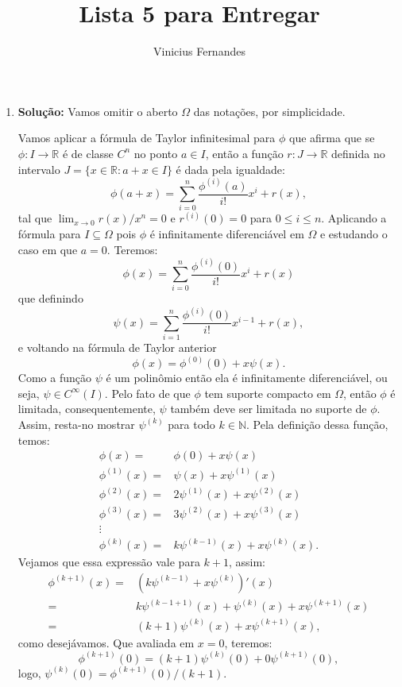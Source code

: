 \documentclass{article}
\begin{document}
	
	\title{Lista 5 para Entregar}
	\author{Vinicius Fernandes}
	
	\maketitle
	
	\begin{enumerate}
		
		\item \textbf{Solução:} Vamos omitir o aberto $\Omega$ das notações, por simplicidade.
		
		Vamos aplicar a fórmula de Taylor infinitesimal para $\phi$ que afirma que se $\phi : I \to \mathbb{R}$ é de classe $C^{n}$ no ponto $a \in I$, então a função $r:J \to \mathbb{R}$ definida no intervalo $J=\{x \in \mathbb{R}: a+x \in I\}$ é dada pela igualdade:
		$$
		\phi(a+x) = \sum_{i=0}^{n}\frac{\phi^{(i)}(a)}{i!}x^{i} + r(x),
		$$
		tal que $\lim_{x \to 0} r(x)/x^{n} = 0$ e $r^{(i)}(0) = 0$ para $0 \leq i \leq n$.
		Aplicando a fórmula para $I \subseteq \Omega$ pois $\phi$ é infinitamente diferenciável em $\Omega$ e estudando o caso em que $a=0$. Teremos: 
		$$
		\phi(x) = \sum_{i=0}^{n}\frac{\phi^{(i)}(0)}{i!}x^{i} + r(x)
		$$
		que definindo
		$$
		\psi(x) = \sum_{i=1}^{n}\frac{\phi^{(i)}(0)}{i!}x^{i-1} + r(x),
		$$
		e voltando na fórmula de Taylor anterior	
		$$
		\phi(x) = \phi^{(0)}(0) + x \psi(x).
		$$
		Como a função $\psi$ é um polinômio então ela é infinitamente diferenciável, ou seja, $\psi \in C^{\infty}(I)$. Pelo fato de que $\phi$ tem suporte compacto em $\Omega$, então $\phi$ é limitada, consequentemente, $\psi$ também deve ser limitada no suporte de $\phi$. Assim, resta-no mostrar $\psi^{(k)}$ para todo $k \in \mathbb{N}$. Pela definição dessa função, temos:
		$$
		\begin{aligned}
		\phi(x) = &\phi(0) + x \psi(x) \\
		\phi^{(1)}(x) =  &\psi(x) + x\psi^{(1)}(x) \\
		\phi^{(2)}(x) =  & 2\psi^{(1)}(x) + x\psi^{(2)}(x) \\
		\phi^{(3)}(x) =  & 3\psi^{(2)}(x) + x\psi^{(3)}(x) \\
		\vdots & \\
		\phi^{(k)}(x) =  & k\psi^{(k-1)}(x) + x\psi^{(k)}(x).
		\end{aligned}
		$$
		Vejamos que essa expressão vale para $k+1$, assim:
		$$
		\begin{aligned}
		\phi^{(k+1)}(x) =  & (k\psi^{(k-1)} + x\psi^{(k)})'(x) \\
		= & k\psi^{(k-1 + 1)}(x) + \psi^{(k)}(x) + x\psi^{(k+1)}(x) \\
		= & (k+1)\psi^{(k)}(x) + x\psi^{(k+1)}(x),
		\end{aligned}
		$$
		como desejávamos. Que avaliada em $x=0$, teremos:
		$$
		\phi^{(k+1)}(0) = (k+1)\psi^{(k)}(0) + 0\psi^{(k+1)}(0),
		$$
		logo, $\psi^{(k)}(0) = \phi^{(k+1)}(0)/(k+1)$.
		

\end{enumerate}
\end{document}
